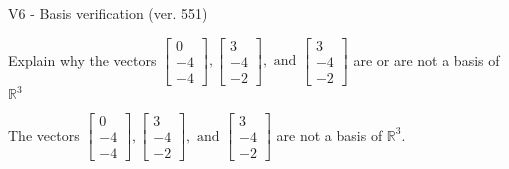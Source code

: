 \begin{exercise}
  \begin{exerciseTitle}V6 - Basis verification (ver. 551)\end{exerciseTitle}
  \begin{exerciseStatement}
    Explain why the vectors \(\left[\begin{array}{r}
0 \\
-4 \\
-4
\end{array}\right] , \left[\begin{array}{r}
3 \\
-4 \\
-2
\end{array}\right] , \text{ and } \left[\begin{array}{r}
3 \\
-4 \\
-2
\end{array}\right]\) are or are not a basis of \(\mathbb{R}^3\)	


  \end{exerciseStatement}
  \begin{exerciseAnswer}
   The vectors \(\left[\begin{array}{r}
0 \\
-4 \\
-4
\end{array}\right] , \left[\begin{array}{r}
3 \\
-4 \\
-2
\end{array}\right] , \text{ and } \left[\begin{array}{r}
3 \\
-4 \\
-2
\end{array}\right]\) 
  	 are not  a basis of \(\mathbb{R}^3\).
  


  \end{exerciseAnswer}
\end{exercise}